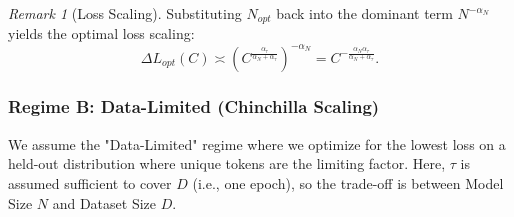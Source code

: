 \documentclass{article}
\theoremstyle{plain}
\theoremstyle{definition}
\theoremstyle{remark}
\newtheorem{remark}[theorem]{Remark}
\begin{document}
\begin{remark}[Loss Scaling]
Substituting $N_{opt}$ back into the dominant term $N^{-\alpha_N}$ yields the optimal loss scaling:
\begin{equation*}
    \Delta L_{opt}(C) \asymp \left( C^{\frac{\alpha_\tau}{\alpha_N + \alpha_\tau}} \right)^{-\alpha_N} = C^{-\frac{\alpha_N \alpha_\tau}{\alpha_N + \alpha_\tau}}.
\end{equation*}
\end{remark}

\subsubsection{Regime B: Data-Limited (Chinchilla Scaling)}
\label{subapp:chinchilla_derivation}

We assume the "Data-Limited" regime where we optimize for the lowest loss on a held-out distribution where unique tokens are the limiting factor. Here, $\tau$ is assumed sufficient to cover $D$ (i.e., one epoch), so the trade-off is between Model Size $N$ and Dataset Size $D$.
\end{document}
